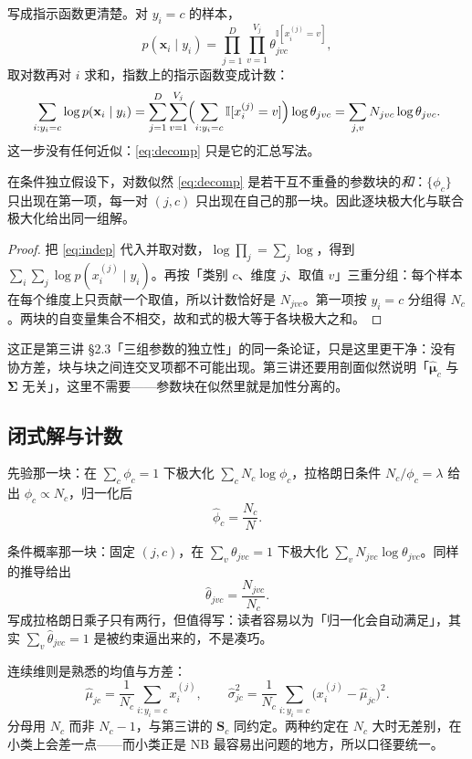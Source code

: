 \documentclass[11pt,a4paper,fontset=windows,zihao=-4]{ctexart}
\newcommand{\bx}{\mathbf{x}}
\newcommand{\bS}{\mathbf{S}}
\newcommand{\bSigma}{\boldsymbol{\Sigma}}
\newcommand{\bmu}{\boldsymbol{\mu}}
\begin{document}
写成指示函数更清楚。对 $y_i=c$ 的样本，
\[
  p(\bx_i\mid y_i)=\prod_{j=1}^{D}\prod_{v=1}^{V_j}\theta_{jvc}^{\mathbb{I}[x_i^{(j)}=v]},
\]
取对数再对 $i$ 求和，指数上的指示函数变成计数：
\[
  \sum_{i:y_i=c}\log p(\bx_i\mid y_i)
  =\sum_{j=1}^{D}\sum_{v=1}^{V_j}
    \Bigl(\sum_{i:y_i=c}\mathbb{I}[x_i^{(j)}=v]\Bigr)\log\theta_{jvc}
  =\sum_{j,v}N_{jvc}\log\theta_{jvc}.
\]
这一步没有任何近似：\eqref{eq:decomp} 只是它的汇总写法。

\begin{prop}[似然的可分离性]
在条件独立假设下，对数似然 \eqref{eq:decomp} 是若干互不重叠的参数块的\emph{和}：$\{\phi_c\}$ 只出现在第一项，每一对 $(j,c)$ 只出现在自己的那一块。因此逐块极大化与联合极大化给出同一组解。
\end{prop}

\begin{proof}
把 \eqref{eq:indep} 代入并取对数，$\log\prod_j=\sum_j\log$，得到 $\sum_i\sum_j\log p(x_i^{(j)}\mid y_i)$。再按「类别 $c$、维度 $j$、取值 $v$」三重分组：每个样本在每个维度上只贡献一个取值，所以计数恰好是 $N_{jvc}$。第一项按 $y_i=c$ 分组得 $N_c$。两块的自变量集合不相交，故和式的极大等于各块极大之和。
\end{proof}

这正是第三讲 §2.3「三组参数的独立性」的同一条论证，只是这里更干净：没有协方差，块与块之间连交叉项都不可能出现。第三讲还要用剖面似然说明「$\hat{\bmu}_c$ 与 $\bSigma$ 无关」，这里不需要——参数块在似然里就是加性分离的。

\subsection{闭式解与计数}

先验那一块：在 $\sum_c\phi_c=1$ 下极大化 $\sum_cN_c\log\phi_c$，拉格朗日条件 $N_c/\phi_c=\lambda$ 给出 $\phi_c\propto N_c$，归一化后
\begin{equation}
  \hat\phi_c=\frac{N_c}{N}.
  \label{eq:phi}
\end{equation}

条件概率那一块：固定 $(j,c)$，在 $\sum_v\theta_{jvc}=1$ 下极大化 $\sum_vN_{jvc}\log\theta_{jvc}$。同样的推导给出
\begin{equation}
  \hat\theta_{jvc}=\frac{N_{jvc}}{N_c}.
  \label{eq:theta}
\end{equation}
写成拉格朗日乘子只有两行，但值得写：读者容易以为「归一化会自动满足」，其实 $\sum_v\hat\theta_{jvc}=1$ 是被约束逼出来的，不是凑巧。

连续维则是熟悉的均值与方差：
\begin{equation}
  \hat\mu_{jc}=\frac{1}{N_c}\sum_{i:y_i=c}x_i^{(j)},\qquad
  \hat\sigma_{jc}^2=\frac{1}{N_c}\sum_{i:y_i=c}\bigl(x_i^{(j)}-\hat\mu_{jc}\bigr)^2 .
  \label{eq:gauss-mle}
\end{equation}
分母用 $N_c$ 而非 $N_c-1$，与第三讲的 $\bS_c$ 同约定。两种约定在 $N_c$ 大时无差别，在小类上会差一点——而小类正是 NB 最容易出问题的地方，所以口径要统一。
\end{document}
